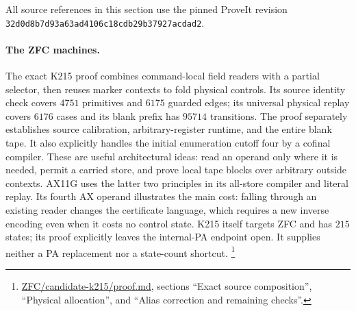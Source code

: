 All source references in this section use the pinned ProveIt revision
\nolinkurl{32d0d8b7d93a63ad4106c18cdb29b37927acdad2}.

\paragraph{The ZFC machines.}
The exact K215 proof combines command-local field readers with a partial
selector, then reuses marker contexts to fold physical controls. Its source
identity check covers $4751$ primitives and $6175$ guarded edges; its
universal physical replay covers $6176$ cases and its blank prefix has
$95714$ transitions. The proof separately establishes source calibration,
arbitrary-register runtime, and the entire blank tape. It also explicitly
handles the initial enumeration cutoff four by a cofinal compiler.
These are useful architectural ideas: read an operand only where it is
needed, permit a carried store, and prove local tape blocks over arbitrary
outside contexts. AX11G uses the latter two principles in its all-store
compiler and literal replay. Its fourth AX operand illustrates the main
cost: falling through an existing reader changes the certificate language,
which requires a new inverse encoding even when it costs no control state.
K215 itself targets ZFC and has $215$ states; its proof explicitly leaves
the internal-PA endpoint open. It supplies neither a PA replacement nor
a state-count shortcut.
\footnote{\href{https://github.com/VladimirReshetnikov/ProveIt/blob/32d0d8b7d93a63ad4106c18cdb29b37927acdad2/Computability/BusyBeaver/Research/ZFC/candidate-k215/proof.md}{ZFC/candidate-k215/proof.md}, sections ``Exact source composition'', ``Physical allocation'', and ``Alias correction and remaining checks''.}

